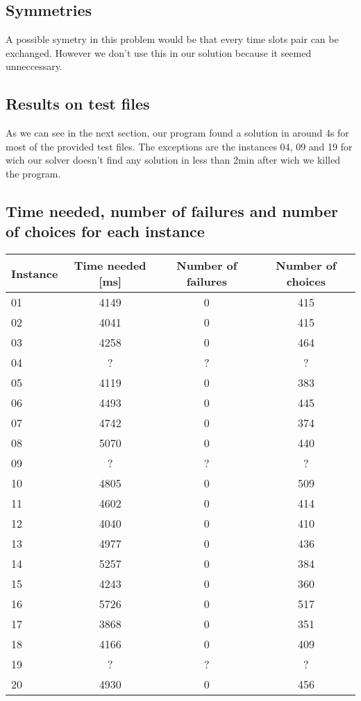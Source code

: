 \documentclass{eplDoc}
\begin{document}
\subsection{Symmetries}

A possible symetry in this problem would be that every time slots pair can be exchanged. However we don't use this in our solution because it seemed unneccessary. 

\subsection{Results on test files}

As we can see in the next section, our program found a solution in around 4s for most of the provided test files. The exceptions are the instances 04, 09 and 19 for wich our solver doesn't find any solution in less than 2min after wich we killed the program. \\ 


\subsection{Time needed, number of failures and number of choices for each instance}
\begin{center}
		\begin{tabular}{|l|c|c|c|}
			\hline
			Instance & Time needed [ms] & Number of failures & Number of choices \\ 
			\hline
			01 & 4149 & 0 & 415 \\ 
			02 & 4041 & 0 & 415 \\ 
			03 & 4258 & 0 & 464 \\ 
			04 & ? & ? & ? \\ 
			05 & 4119 & 0 & 383 \\ 
			06 & 4493 & 0 & 445 \\ 
			07 & 4742 & 0 & 374 \\ 
			08 & 5070 & 0 & 440 \\ 
			09 & ? & ? & ? \\ 
			10 & 4805 & 0 & 509 \\ 
			11 & 4602 & 0 & 414 \\ 
			12 & 4040 & 0 & 410 \\ 
			13 & 4977 & 0 & 436 \\ 
			14 & 5257 & 0 & 384 \\ 
			15 & 4243 & 0 & 360 \\ 
			16 & 5726 & 0 & 517 \\ 
			17 & 3868 & 0 & 351 \\ 
			18 & 4166 & 0 & 409 \\ 
			19 & ? & ? & ? \\ 
			20 & 4930 & 0 & 456 \\
			\hline
		\end{tabular}
\end{center}
\end{document}
